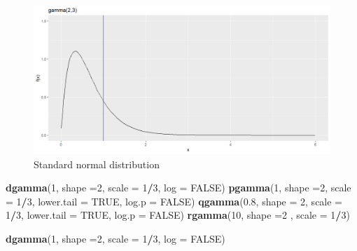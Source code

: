 \documentclass[
]{book}
\newenvironment{Shaded}{\begin{snugshade}}{\end{snugshade}}
\newcommand{\AttributeTok}[1]{\textcolor[rgb]{0.13,0.29,0.53}{#1}}
\newcommand{\ConstantTok}[1]{\textcolor[rgb]{0.56,0.35,0.01}{#1}}
\newcommand{\DecValTok}[1]{\textcolor[rgb]{0.00,0.00,0.81}{#1}}
\newcommand{\FloatTok}[1]{\textcolor[rgb]{0.00,0.00,0.81}{#1}}
\newcommand{\FunctionTok}[1]{\textcolor[rgb]{0.13,0.29,0.53}{\textbf{#1}}}
\newcommand{\NormalTok}[1]{#1}
\newcommand{\SpecialCharTok}[1]{\textcolor[rgb]{0.81,0.36,0.00}{\textbf{#1}}}
\begin{document}
\begin{figure}

{\centering \includegraphics{figure/gamma-1} 

}

\caption{Standard normal distribution}\label{fig:gamma}
\end{figure}

\begin{Shaded}
\begin{Highlighting}[]
\FunctionTok{dgamma}\NormalTok{(}\DecValTok{1}\NormalTok{, }\AttributeTok{shape =}\DecValTok{2}\NormalTok{, }\AttributeTok{scale =} \DecValTok{1}\SpecialCharTok{/}\DecValTok{3}\NormalTok{, }\AttributeTok{log =} \ConstantTok{FALSE}\NormalTok{)}
\FunctionTok{pgamma}\NormalTok{(}\DecValTok{1}\NormalTok{, }\AttributeTok{shape =}\DecValTok{2}\NormalTok{, }\AttributeTok{scale =} \DecValTok{1}\SpecialCharTok{/}\DecValTok{3}\NormalTok{, }\AttributeTok{lower.tail =} \ConstantTok{TRUE}\NormalTok{,}
       \AttributeTok{log.p =} \ConstantTok{FALSE}\NormalTok{)}
\FunctionTok{qgamma}\NormalTok{(}\FloatTok{0.8}\NormalTok{, }\AttributeTok{shape =} \DecValTok{2}\NormalTok{,  }\AttributeTok{scale =} \DecValTok{1}\SpecialCharTok{/}\DecValTok{3}\NormalTok{, }\AttributeTok{lower.tail =} \ConstantTok{TRUE}\NormalTok{,}
       \AttributeTok{log.p =} \ConstantTok{FALSE}\NormalTok{)}
\FunctionTok{rgamma}\NormalTok{(}\DecValTok{10}\NormalTok{, }\AttributeTok{shape =}\DecValTok{2}\NormalTok{ , }\AttributeTok{scale =} \DecValTok{1}\SpecialCharTok{/}\DecValTok{3}\NormalTok{)}
\end{Highlighting}
\end{Shaded}

\begin{Shaded}
\begin{Highlighting}[]
\FunctionTok{dgamma}\NormalTok{(}\DecValTok{1}\NormalTok{, }\AttributeTok{shape =}\DecValTok{2}\NormalTok{, }\AttributeTok{scale =} \DecValTok{1}\SpecialCharTok{/}\DecValTok{3}\NormalTok{, }\AttributeTok{log =} \ConstantTok{FALSE}\NormalTok{)}
\end{Highlighting}
\end{Shaded}
\end{document}
